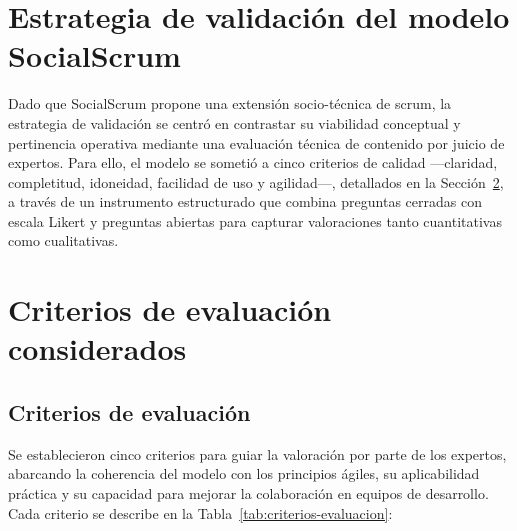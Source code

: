 \section{Estrategia de validación del modelo SocialScrum}
Dado que SocialScrum propone una extensión socio-técnica de \gls{scrum}, la estrategia de validación se centró en contrastar su viabilidad conceptual y pertinencia operativa mediante una evaluación técnica de contenido por juicio de expertos. Para ello, el modelo se sometió a cinco criterios de calidad ---claridad, completitud, idoneidad, facilidad de uso y agilidad---, detallados en la Sección~\ref{sec:criterios-evaluacion}, a través de un instrumento estructurado que combina preguntas cerradas con escala Likert y preguntas abiertas para capturar valoraciones tanto cuantitativas como cualitativas.

\section{Criterios de evaluación considerados}
\label{sec:criterios-evaluacion}
\subsection{Criterios de evaluación}
Se establecieron cinco criterios para guiar la valoración por parte de los expertos, abarcando la coherencia del modelo con los principios ágiles, su aplicabilidad práctica y su capacidad para mejorar la colaboración en equipos de desarrollo. Cada criterio se describe en la Tabla~\ref{tab:criterios-evaluacion}:

\begingroup
\scriptsize
\renewcommand{\arraystretch}{1.4}
\setlength{\tabcolsep}{3pt}

